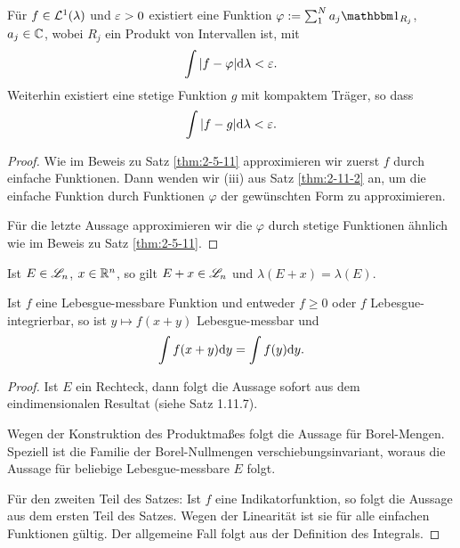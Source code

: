 \begin{thm}
  Für $f \in \mathcal{L}^1(\lambda)$ und $\varepsilon > 0$ existiert eine Funktion $\varphi
  := \sum_1^N a_j \ind_{R_j}$, $a_j \in \mathbb{C}$, wobei $R_j$ ein Produkt von
  Intervallen ist, mit
  \[ \int |f - \varphi| \mathrm{d} \lambda < \varepsilon. \]
  Weiterhin existiert eine stetige Funktion $g$ mit kompaktem Träger, so dass
  \[ \int |f-g| \mathrm{d} \lambda < \varepsilon. \]
\end{thm}
\begin{proof}
  Wie im Beweis zu Satz \ref{thm:2-5-11} approximieren wir zuerst $f$ durch
  einfache Funktionen. Dann wenden wir (iii) aus Satz \ref{thm:2-11-2} an, um
  die einfache Funktion durch Funktionen $\varphi$ der gewünschten Form zu
  approximieren.

  Für die letzte Aussage approximieren wir die $\varphi$ durch stetige
  Funktionen ähnlich wie im Beweis zu Satz \ref{thm:2-5-11}.
\end{proof}

\begin{thm}\label{thm:2-11-4}
  Ist $E \in \mathscr{L}_n$, $x \in \mathbb{R}^n$, so gilt $E+x\in \mathscr{L}_n$ und
  $\lambda(E+x) = \lambda(E)$.

  Ist $f$ eine Lebesgue-messbare Funktion und entweder $f \ge 0$ oder $f$
  Lebesgue-integrierbar, so ist $y \mapsto f(x+y)$ Lebesgue-messbar und
  \[ \int f(x+y) \mathrm{d} y = \int f(y) \mathrm{d} y. \]
\end{thm}

\begin{proof}
  Ist $E$ ein Rechteck, dann folgt die Aussage sofort aus dem eindimensionalen
  Resultat (siehe Satz 1.11.7). 

  Wegen der Konstruktion des Produktmaßes folgt die Aussage für Borel-Mengen.
  Speziell ist die Familie der Borel-Nullmengen verschiebungsinvariant, woraus
  die Aussage für beliebige Lebesgue-messbare $E$ folgt.

  Für den zweiten Teil des Satzes: Ist $f$ eine Indikatorfunktion, so folgt die
  Aussage aus dem ersten Teil des Satzes. Wegen der Linearität ist sie für alle
  einfachen Funktionen gültig. Der allgemeine Fall folgt aus der Definition des
  Integrals.
\end{proof}

